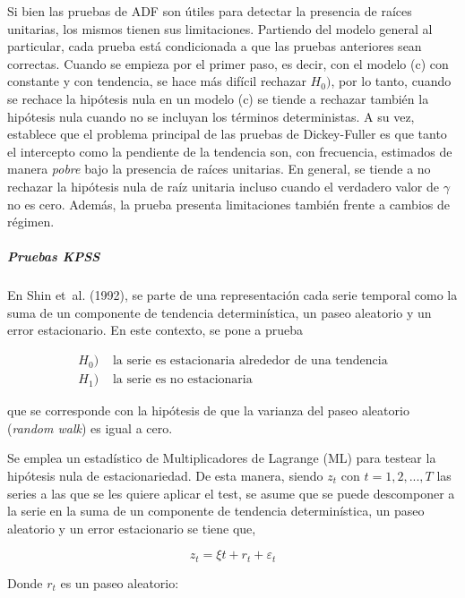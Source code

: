 \documentclass[
  oneside]{article}
\begin{document}
Si bien las pruebas de ADF son útiles para detectar la presencia de
raíces unitarias, los mismos tienen sus limitaciones. Partiendo del
modelo general al particular, cada prueba está condicionada a que las
pruebas anteriores sean correctas. Cuando se empieza por el primer paso,
es decir, con el modelo (c) con constante y con tendencia, se hace más
difícil rechazar \(H_0)\), por lo tanto, cuando se rechace la hipótesis
nula en un modelo (c) se tiende a rechazar también la hipótesis nula
cuando no se incluyan los términos deterministas. A su vez, establece
que el problema principal de las pruebas de Dickey-Fuller es que tanto
el intercepto como la pendiente de la tendencia son, con frecuencia,
estimados de manera \textit{pobre} bajo la presencia de raíces
unitarias. En general, se tiende a no rechazar la hipótesis nula de raíz
unitaria incluso cuando el verdadero valor de \(\gamma\) no es cero.
Además, la prueba presenta limitaciones también frente a cambios de
régimen.

\newpage

\hypertarget{pruebas-kpss}{%
\subparagraph{Pruebas KPSS}\label{pruebas-kpss}}

En Shin et~al. (1992), se parte de una representación cada serie
temporal como la suma de un componente de tendencia determinística, un
paseo aleatorio y un error estacionario. En este contexto, se pone a
prueba

\begin{align*}
    H_0)&\text{ la serie es estacionaria alrededor de una tendencia}    \\
    H_1)&\text{ la serie es no estacionaria}
\end{align*}

que se corresponde con la hipótesis de que la varianza del paseo
aleatorio (\textit{random walk}) es igual a cero.

Se emplea un estadístico de Multiplicadores de Lagrange (ML) para
testear la hipótesis nula de estacionariedad. De esta manera, siendo
\(z_t\) con \(t=1,2,...,T\) las series a las que se les quiere aplicar
el test, se asume que se puede descomponer a la serie en la suma de un
componente de tendencia determinística, un paseo aleatorio y un error
estacionario se tiene que,

\begin{equation}
    \label{eq: kpss2}    
    z_t=\xi t + r_t + \varepsilon_t
\end{equation}

Donde \(r_t\) es un paseo aleatorio:
\end{document}
